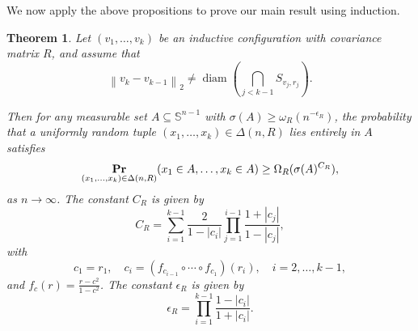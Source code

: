 \documentclass[11pt]{article}
\newtheorem{theorem}{Theorem}[section]
\newcommand{\norm}[1]{\left\lVert#1\right\rVert}
\renewcommand{\Pr}{\mathop{\bf Pr\/}}
\begin{document}
We now apply the above propositions to prove our main result using induction.

\begin{theorem}
\label{thm: density R configuration}
Let \( (v_1, \dots, v_k) \) be an inductive configuration with covariance matrix \( R \), and assume that
\[
\norm{v_k - v_{k-1}}_2 \neq \operatorname{diam}\left(\bigcap_{j < k-1} S_{v_j, r_j}\right).
\]

Then for any measurable set \( A \subseteq \mathbb{S}^{n-1} \) with \( \sigma(A) \geq \omega_R(n^{-\epsilon_R}) \), the probability that a uniformly random tuple \( (x_1, \dots, x_k) \in \Delta(n, R) \) lies entirely in \( A \) satisfies
\[
\Pr_{(x_1, \dots, x_k) \in \Delta(n, R)}(x_1 \in A, \dots, x_k \in A) \geq \Omega_R(\sigma(A)^{C_R}),
\]
as \( n \to \infty \). The constant \( C_R \) is given by
\[
C_R = \sum_{i=1}^{k-1} \frac{2}{1 - |c_i|} \prod_{j=1}^{i-1} \frac{1 + |c_j|}{1 - |c_j|},
\]
with
\[
c_1 = r_1, \quad c_i = (f_{c_{i-1}} \circ \cdots \circ f_{c_1})(r_i), \quad i = 2, \dots, k-1,
\]
and \( f_c(r) = \frac{r - c^2}{1 - c^2} \). The constant $\epsilon_R$ is given by
$$\epsilon_R=\prod_{i=1}^{k-1}\frac{1-|c_i|}{1+|c_i|}.$$
\end{theorem}
\end{document}
